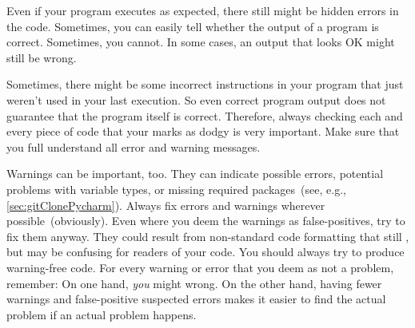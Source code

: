 Even if your program executes as expected, there still might be hidden errors in the code.
Sometimes, you can easily tell whether the output of a program is correct.
Sometimes, you cannot.
In some cases, an output that looks OK might still be wrong.

Sometimes, there might be some incorrect instructions in your program that just weren't used in your last execution.
So even correct program output does not guarantee that the program itself is correct.
Therefore, always checking each and every piece of code that your  marks as dodgy is very important.
Make sure that you full understand all error and warning messages.

Warnings can be important, too.
They can indicate possible errors, potential problems with variable types, or missing required packages~(see, e.g., \cref{sec:gitClonePycharm}).
Always fix errors and warnings wherever possible~(obviously).
Even where you deem the warnings as false-positives, try to fix them anyway.
They could result from non-standard code formatting that still , but may be confusing for readers of your code.
You should always try to produce warning-free code.
For every warning or error that you deem as not a problem, remember:
On one hand, \emph{you} might wrong.
On the other hand, having fewer warnings and false-positive suspected errors makes it easier to find the actual problem if an actual problem happens.%
%
\endhsection%
\FloatBarrier%
\endhsection%
%
